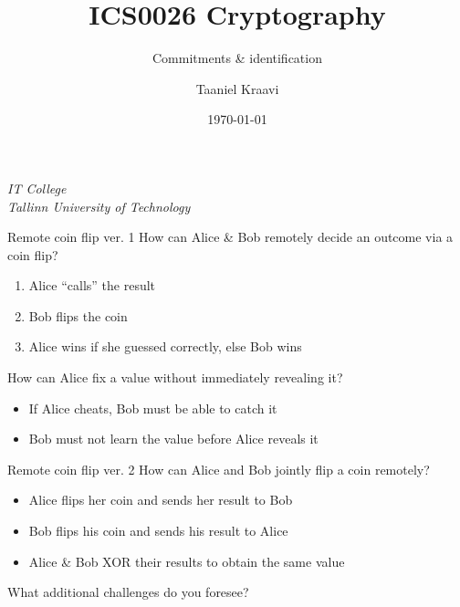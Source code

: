 \usetikzlibrary{positioning,calc}
\graphicspath{ {../../images/} }

\title{ICS0026 Cryptography}
\subtitle{Commitments \& identification}
\date{\today}
\author{Taaniel Kraavi}
\institute%
{%
  \textit{IT College}\\
  \textit{Tallinn University of Technology}
}


\begin{frame}
  \titlepage
\end{frame}

\begin{frame}{Remote coin flip ver. 1}
  How can Alice \& Bob remotely decide an outcome via a coin flip?
  \begin{enumerate}[<+(1)->]
    \item Alice \enquote{calls} the result
    \item Bob flips the coin
    \item Alice wins if she guessed correctly, else Bob wins
  \end{enumerate}

  \vspace*{1em}

  \pause
  How can Alice fix a value without immediately revealing it? 
  \begin{itemize}[<+(1)->]
    \item If Alice cheats, Bob must be able to catch it
    \item Bob must not learn the value before Alice reveals it
  \end{itemize}
\end{frame}

\begin{frame}{Remote coin flip ver. 2}
  How can Alice and Bob jointly flip a coin remotely?
  \begin{itemize}[<+(1)->]
    \item Alice flips her coin and sends her result to Bob
    \item Bob flips his coin and sends his result to Alice
    \item Alice \& Bob XOR their results to obtain the same value
  \end{itemize}

  \vspace*{1em}

  \pause
  What additional challenges do you foresee?
\end{frame}

